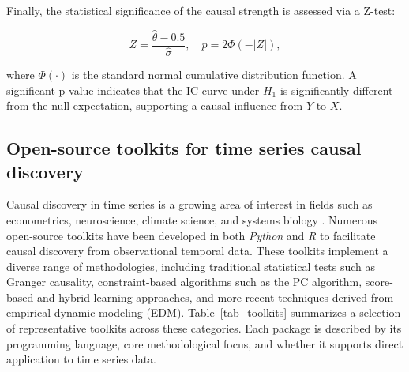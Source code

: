 \documentclass[authoryear,preprint,review,12pt]{elsarticle}
\begin{document}
Finally, the statistical significance of the causal strength is assessed via a Z-test:

\begin{equation}
Z = \frac{\hat{\theta} - 0.5}{\hat{\sigma}}, \quad p = 2 \Phi(-|Z|),
\end{equation}

\noindent where $\Phi(\cdot)$ is the standard normal cumulative distribution function. A significant p-value indicates that the IC curve under $H_1$ is significantly different from the null expectation, supporting a causal influence from $Y$ to $X$.

\subsection{Open-source toolkits for time series causal discovery}

Causal discovery in time series is a growing area of interest in fields such as econometrics, neuroscience, climate science, and systems biology \citep{runge2019ictsess,runge2023cits}. Numerous open-source toolkits have been developed in both \textit{Python} and \textit{R} to facilitate causal discovery from observational temporal data. These toolkits implement a diverse range of methodologies, including traditional statistical tests such as Granger causality, constraint-based algorithms such as the PC algorithm, score-based and hybrid learning approaches, and more recent techniques derived from empirical dynamic modeling (EDM). Table~\ref{tab_toolkits} summarizes a selection of representative toolkits across these categories. Each package is described by its programming language, core methodological focus, and whether it supports direct application to time series data.
\end{document}
